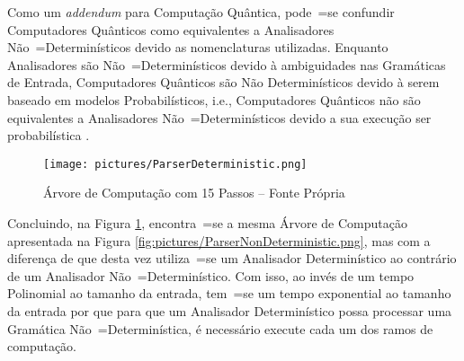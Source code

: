 {    Como um \textit{addendum} para Computação Quântica,
    pode~=se confundir Computadores Quânticos como equivalentes a Analisadores Não~=Determinísticos devido as nomenclaturas utilizadas.
    Enquanto Analisadores são Não~=Determinísticos devido à ambiguidades nas Gramáticas de Entrada,
    Computadores Quânticos são Não Determinísticos devido à serem baseado em modelos Probabilísticos,
    i.e.,
    Computadores Quânticos não são equivalentes a Analisadores Não~=Determinísticos devido a sua execução ser probabilística \cite{polynomialQuantumComputers,probabilisticQuantumComputation,quantumSimulatorChagas}.

    \begin{figure}[H]
    \centering
    \texttt{[image: pictures/ParserDeterministic.png]}
    \caption{Árvore de Computação com 15 Passos -- Fonte Própria}
    \label{fig:pictures/ParserDeterministic.png}
    \end{figure}

    Concluindo,
    na Figura \ref{fig:pictures/ParserDeterministic.png},
    encontra~=se a mesma Árvore de Computação apresentada na Figura \ref{fig:pictures/ParserNonDeterministic.png},
    mas com a diferença de que desta vez utiliza~=se um Analisador Determinístico ao contrário de um Analisador Não~=Determinístico.
    Com isso,
    ao invés de um tempo Polinomial ao tamanho da entrada,
    tem~=se um tempo exponential ao tamanho da entrada por que para que um Analisador Determinístico possa processar uma Gramática Não~=Determinística,
    é necessário execute cada um dos ramos de computação.

}
